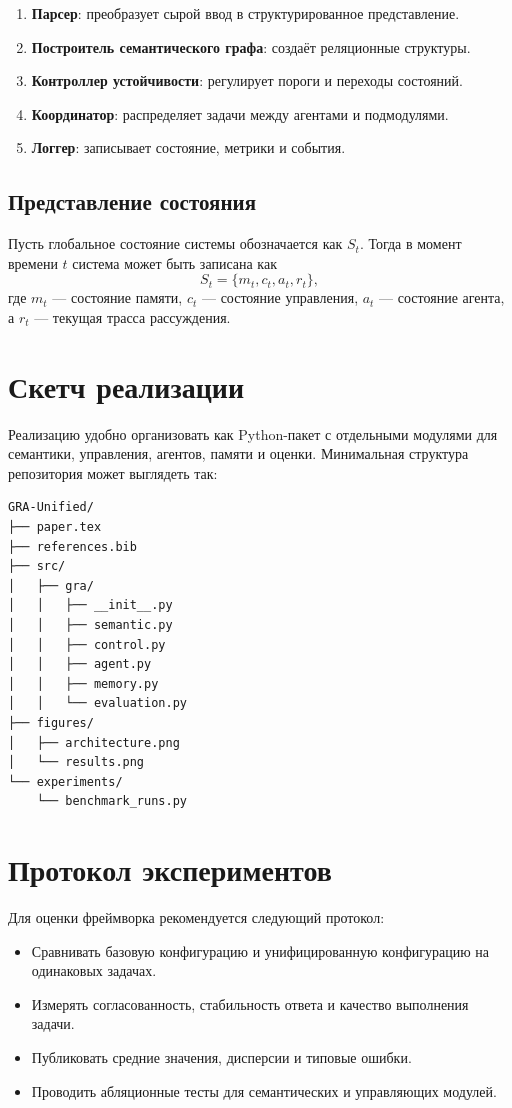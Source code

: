 \documentclass[11pt,a4paper]{article}
\begin{document}
\begin{enumerate}
    \item \textbf{Парсер}: преобразует сырой ввод в структурированное представление.
    \item \textbf{Построитель семантического графа}: создаёт реляционные структуры.
    \item \textbf{Контроллер устойчивости}: регулирует пороги и переходы состояний.
    \item \textbf{Координатор}: распределяет задачи между агентами и подмодулями.
    \item \textbf{Логгер}: записывает состояние, метрики и события.
\end{enumerate}

\subsection{Представление состояния}
Пусть глобальное состояние системы обозначается как \( S_t \). Тогда в момент времени \( t \) система может быть записана как
\[
S_t = \{m_t, c_t, a_t, r_t\},
\]
где \( m_t \) — состояние памяти, \( c_t \) — состояние управления, \( a_t \) — состояние агента, а \( r_t \) — текущая трасса рассуждения.

\section{Скетч реализации}
Реализацию удобно организовать как Python-пакет с отдельными модулями для семантики, управления, агентов, памяти и оценки. Минимальная структура репозитория может выглядеть так:

\begin{lstlisting}[language=bash,caption={Пример структуры репозитория}]
GRA-Unified/
├── paper.tex
├── references.bib
├── src/
│   ├── gra/
│   │   ├── __init__.py
│   │   ├── semantic.py
│   │   ├── control.py
│   │   ├── agent.py
│   │   ├── memory.py
│   │   └── evaluation.py
├── figures/
│   ├── architecture.png
│   └── results.png
└── experiments/
    └── benchmark_runs.py
\end{lstlisting}

\section{Протокол экспериментов}
Для оценки фреймворка рекомендуется следующий протокол:

\begin{itemize}
    \item Сравнивать базовую конфигурацию и унифицированную конфигурацию на одинаковых задачах.
    \item Измерять согласованность, стабильность ответа и качество выполнения задачи.
    \item Публиковать средние значения, дисперсии и типовые ошибки.
    \item Проводить абляционные тесты для семантических и управляющих модулей.
\end{itemize}
\end{document}
